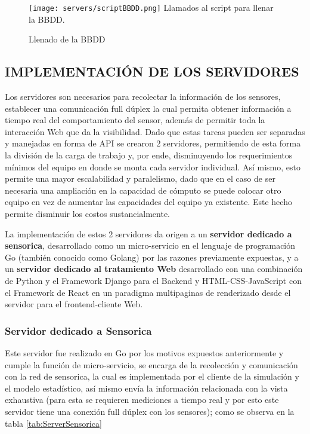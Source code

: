 	\begin{figure}[htb]
		\centering
        \caption{Llenado de la BBDD}
        \texttt{[image: servers/scriptBBDD.png]}
        Llamados al script para llenar la BBDD.    \label{img:scriptBBDD}
	\end{figure}

\subsection{IMPLEMENTACIÓN DE LOS SERVIDORES}

    Los servidores son necesarios para recolectar la información de los sensores,
    establecer una comunicación full dúplex la cual permita obtener información
    a tiempo real del comportamiento del sensor, además de permitir toda la
    interacción Web que da la visibilidad. Dado que estas tareas pueden ser
    separadas y manejadas en forma de API se crearon 2 servidores, permitiendo
    de esta forma la división de la carga de trabajo y, por ende, disminuyendo los
    requerimientos mínimos del equipo en donde se monta cada servidor individual.
    Así mismo, esto permite una mayor escalabilidad y paralelismo, dado que en el
    caso de ser necesaria una ampliación en la capacidad de cómputo se puede colocar
    otro equipo en vez de aumentar las capacidades del equipo ya existente. Este
    hecho permite disminuir los costos sustancialmente.

    La implementación de estos 2 servidores da origen a un \textbf{servidor dedicado
    a sensorica}, desarrollado como un micro-servicio en el lenguaje de programación
    Go (también conocido como Golang) por las razones previamente expuestas, y
    a un \textbf{servidor dedicado al tratamiento Web} desarrollado con una
    combinación de Python y el Framework Django para el Backend y HTML-CSS-JavaScript
    con el Framework de React en un paradigma multipaginas de renderizado desde
    el servidor para el frontend-cliente Web.

    \subsubsection{Servidor dedicado a Sensorica}


    Este servidor fue realizado en Go por los motivos expuestos anteriormente y
    cumple la función de micro-servicio, se encarga de la recolección y comunicación
    con la red de sensorica, la cual es implementada por el cliente de la simulación
    y el modelo estadístico, así mismo envía la información relacionada con la
    vista exhaustiva (para esta se requieren mediciones a tiempo real y por esto
    este servidor tiene una conexión full dúplex con los sensores);
    como se observa en la tabla \ref{tab:ServerSensorica}

